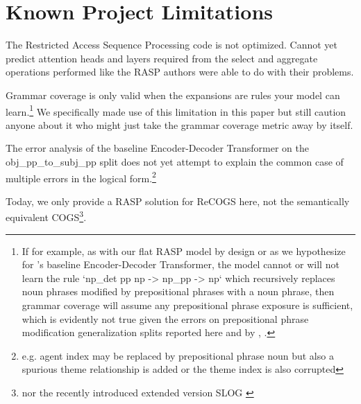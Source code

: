 \documentclass[11pt]{article}
\begin{document}
\section*{Known Project Limitations}

The Restricted Access Sequence Processing code is not optimized. Cannot yet predict attention heads and layers required from the select and aggregate operations performed like the RASP authors \cite{Weiss2021} were able to do with their problems.

Grammar coverage \cite{fuzzingbook2023:GrammarCoverageFuzzer} is only valid when the expansions are rules your model can learn.\footnote{
If for example, as with our flat RASP model by design or as we hypothesize for \cite{Wu2023}'s baseline Encoder-Decoder Transformer, the model cannot or will not learn the rule `np\_det pp np -> np\_pp -> np` which recursively replaces noun phrases modified by prepositional phrases with a noun phrase, then grammar coverage will assume any prepositional phrase exposure is sufficient, which is evidently not true given the errors on prepositional phrase modification generalization splits reported here and by \cite{Wu2023}, \cite{KimLinzen2020}.
} We specifically made use of this limitation in this paper but still caution anyone about it who might just take the grammar coverage metric away by itself.

The error analysis of the \cite{Wu2023} baseline Encoder-Decoder Transformer on the obj\_pp\_to\_subj\_pp split does not yet attempt to explain the common case of multiple errors in the logical form.\footnote{e.g. agent index may be replaced by prepositional phrase noun but also a spurious theme relationship is added or the theme index is also corrupted}

Today, we only provide a RASP solution for ReCOGS \cite{Wu2023} here, not the semantically equivalent COGS\footnote{nor the recently introduced extended version SLOG \cite{li2023slogstructuralgeneralizationbenchmark}}.
\end{document}
